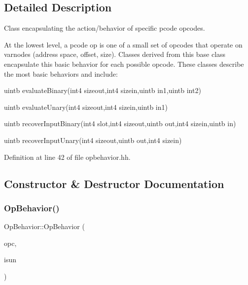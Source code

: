 \subsection{Detailed Description}
Class encapsulating the action/behavior of specific pcode opcodes. 

At the lowest level, a pcode op is one of a small set of opcodes that operate on varnodes (address space, offset, size). Classes derived from this base class encapsulate this basic behavior for each possible opcode. These classes describe the most basic behaviors and include\+:
\begin{DoxyItemize}
\item uintb evaluate\+Binary(int4 sizeout,int4 sizein,uintb in1,uintb int2)
\item uintb evaluate\+Unary(int4 sizeout,int4 sizein,uintb in1)
\item uintb recover\+Input\+Binary(int4 slot,int4 sizeout,uintb out,int4 sizein,uintb in)
\item uintb recover\+Input\+Unary(int4 sizeout,uintb out,int4 sizein) 
\end{DoxyItemize}

Definition at line 42 of file opbehavior.\+hh.



\subsection{Constructor \& Destructor Documentation}
\mbox{\label{class_op_behavior_a2cfe8e17b3746132a974e865938e5637}} 
\subsubsection{\texorpdfstring{OpBehavior()}{OpBehavior()}\hspace{0.1cm}{\footnotesize\ttfamily [1/2]}}
{\footnotesize\ttfamily Op\+Behavior\+::\+Op\+Behavior (\begin{DoxyParamCaption}\item[{\mbox{\hyperlink{opcodes_8hh_abeb7dfb0e9e2b3114e240a405d046ea7}{Op\+Code}}}]{opc,  }\item[{bool}]{isun }\end{DoxyParamCaption})\hspace{0.3cm}{\ttfamily [inline]}}



